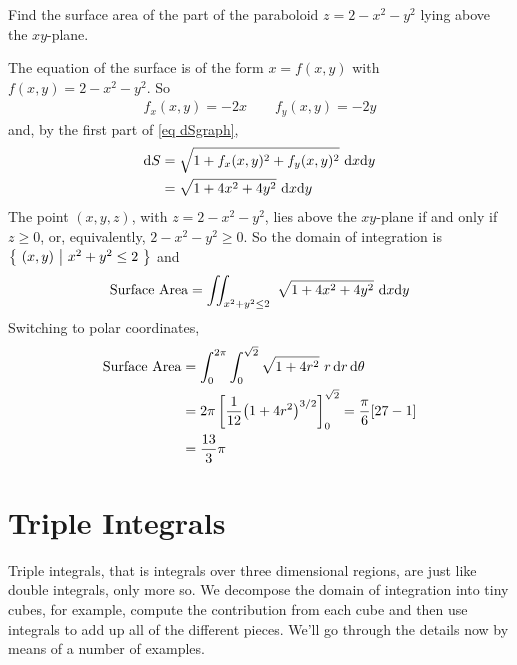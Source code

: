 \begin{eg}\label{eg area paraboloid}
Find the surface area of the part of the paraboloid $z=2-x^2-y^2$
lying above the $xy$-plane. 

\soln
The equation of the surface is of the form $x=f(x,y)$ with $f(x,y)=2-x^2-y^2$.
So 
\begin{align*}
f_x(x,y) =-2x\qquad
f_y(x,y) =-2y
\end{align*}
and, by the first part of \eqref{eq dSgraph},
\begin{align*}
\mathrm{d}S &= \sqrt{1 + f_x(x,y)^2 + f_y(x,y)^2}\  \mathrm{d}x\mathrm{d}y \\
   &=\sqrt{1+4x^2+4y^2} \ \mathrm{d}x\mathrm{d}y 
\end{align*}
The point $(x,y,z)$, with $z=2-x^2-y^2$, lies above the $xy$-plane if and only 
if $z\ge 0$, or, equivalently, $2-x^2-y^2\ge 0$. So the domain of 
integration is $\big\{ \ (x,y)\ \big|\ x^2+y^2\le 2\ \big\}$ and
\begin{equation*}
\text{Surface Area} = \dblInt_{x^2+y^2\le 2}\ \sqrt{1+4x^2+4y^2} \ \dee{x}\dee{y}
\end{equation*}
Switching to polar coordinates,
\begin{align*}
\text{Surface Area} 
&=\int_0^{2\pi}\int_0^{\sqrt{2}}\sqrt{1+4r^2}\  r\,\mathrm{d}r\, \mathrm{d}\theta\\
&=2\pi\left[\frac{1}{12}{\big(1+4r^2\big)}^{3/2}\right]_0^{\sqrt{2}}
=\frac{\pi}{6}[27-1] \\
&=\frac{13}{3}\pi
\end{align*}
\end{eg}


\section{Triple Integrals}\label{sec 3d integrals}
Triple integrals, that is integrals over three dimensional regions,
are just like double integrals, only more so. We decompose the
domain of integration into tiny cubes, for example,
compute the contribution from each cube and then use integrals
to add up all of the different pieces. We'll go through the
details now by means of a number of examples.

